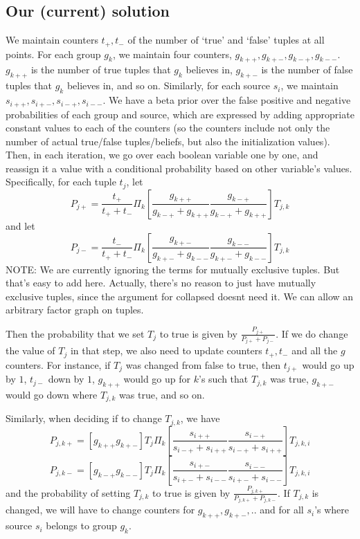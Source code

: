\documentclass{sig-alternate}
\newcounter{prob}
\begin{document}
\subsection{Our (current) solution}
We maintain counters $t_{+}, t_{-}$ of the number of `true' and `false' tuples at all points. For each group $g_k$, we maintain four counters, $g_{k++}, g_{k+-}, g_{k-+}, g_{k--}$. $g_{k++}$ is the number of true tuples that $g_k$ believes in, $g_{k+-}$ is the number of false tuples that $g_k$ believes in, and so on. Similarly, for each source $s_i$, we maintain $s_{i++}, s_{i+-}, s_{i-+}, s_{i--}$. We have a beta prior over the false positive and negative probabilities of each group and source, which are expressed by adding appropriate constant values to each of the counters (so the counters include not only the number of actual true/false tuples/beliefs, but also the initialization values). Then, in each iteration, we go over each boolean variable one by one, and reassign it a value with a conditional probability based on other variable's values. Specifically, for each tuple $t_j$, let 
$$P_{j+} = \frac{t_{+}}{t_{+}+t_{-}}\Pi_{k}\left[ \frac{g_{k++}}{g_{k-+} + g_{k++}} \frac{g_{k-+}}{g_{k-+} + g_{k++}}  \right] T_{j, k}$$ 
and let 
$$P_{j-} = \frac{t_{-}}{t_{+}+t_{-}}\Pi_{k}\left[ \frac{g_{k+-}}{g_{k+-} + g_{k--}} \frac{g_{k--}}{g_{k+-} + g_{k--}}  \right] T_{j, k}$$ 
NOTE: We are currently ignoring the terms for mutually exclusive tuples. But that's easy to add here. Actually, there's no reason to just have mutually exclusive tuples, since the argument for collapsed doesnt need it. We can allow an arbitrary factor graph on tuples. 

Then the probability that we set $T_j$ to true is given by $\frac{P_{j+}}{P_{j+}+P_{j-}}$. If we do change the value of $T_j$ in that step, we also need to update counters $t_{+}, t_{-}$ and all the $g$ counters. For instance, if $T_j$ was changed from false to true, then $t_{j+}$ would go up by $1$, $t_{j-}$ down by $1$, $g_{k++}$ would go up for $k$'s such that $T_{j,k}$ was true, $g_{k+-}$ would go down where $T_{j,k}$ was true, and so on. 

Similarly, when deciding if to change $T_{j,k}$, we have
$$P_{j,k+} = [g_{k++} g_{k+-}] T_j \Pi_{k}\left[ \frac{s_{i++}}{s_{i-+} + s_{i++}} \frac{s_{i-+}}{s_{i-+} + s_{i++}}  \right] T_{j, k, i}$$ 
$$P_{j,k-} = [g_{k-+} g_{k--}] T_j \Pi_{k}\left[ \frac{s_{i+-}}{s_{i+-} + s_{i--}} \frac{s_{i--}}{s_{i+-} + s_{i--}}  \right] T_{j, k, i}$$ 
and the probability of setting $T_{j,k}$ to true is given by $\frac{P_{j,k+}}{P_{j,k+} + P_{j,k-}}$. If $T_{j,k}$ is changed, we will have to change counters for $g_{k++}, g_{k+-}, ..$ and for all $s_i$'s where source $s_i$ belongs to group $g_k$.
\end{document}

